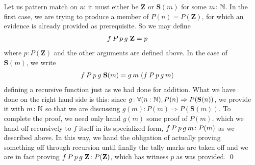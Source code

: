 \documentclass[11pt]{article}
\begin{document}
\begin{my proof}
Let us pattern match on $n$: it must either be $\mathbf{Z}$ or $\mathbf{S}(m)$ for some $m \colon \mathbb{N}$. In the first case, we are trying to produce a member of $P(n) = P(\mathbf{Z})$, for which an evidence is already provided as prerequisite. So we may define \begin{gather*}
f \hspace{0.2em} P \hspace{0.2em} p \hspace{0.2em} g \hspace{0.3em} \mathbf{Z} = p
\end{gather*}
where $p \colon P(\mathbf{Z})$ and the other arguments are defined above. In the case of $\mathbf{S}(m)$, we write \begin{gather*}
f \hspace{0.2em} P \hspace{0.2em} p \hspace{0.2em} g \hspace{0.3em} \mathbf{S}(m) = g \hspace{0.2em} m \hspace{0.3em} (f \hspace{0.2em} P \hspace{0.2em} p \hspace{0.2em} g \hspace{0.2em} m)
\end{gather*}
defining a recursive function just as we had done for addition. What we have done on the right hand side is this: since $g\colon \forall (n : \mathbb{N}), P(n) \Rightarrow P(\mathbf{S}(n))$, we provide it with $m \colon \mathbb{N}$ so that we are discussing $g(m) \colon P(m) \Rightarrow P(\mathbf{S}(m))$. To complete the proof, we need only hand $g(m)$ some proof of $P(m)$, which we hand off recursively to $f$ itself in its specialized form, $f \hspace{0.2em} P \hspace{0.2em} p \hspace{0.2em} g \hspace{0.2em} m \colon P(m)$ as we described above. In this way, we hand the obligation of actually proving something off through recursion until finally the tally marks are taken off and we are in fact proving $f \hspace{0.2em} P \hspace{0.2em} p \hspace{0.2em} g \hspace{0.3em} \mathbf{Z} \colon P(\mathbf{Z})$, which has witness $p$ as was provided. \qed
\end{my proof}
\end{document}

